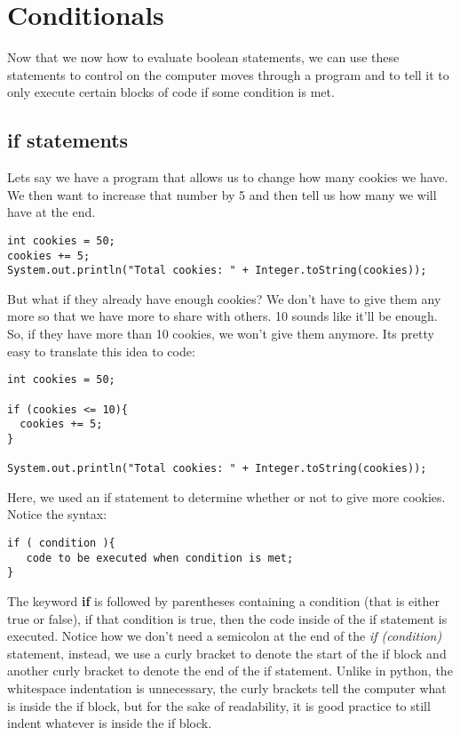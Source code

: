 \documentclass[14pt]{extreport}%
\begin{document}
\section*{Conditionals }
Now that we now how to evaluate boolean statements, we can use these statements to control on the computer moves through a program and to tell it to only execute certain blocks of code if some condition is met.

\subsection*{if statements}
Lets say we have a program that allows us to change how many cookies we have. We then want to increase that number by 5 and then tell us how
many we will have at the end.

\begin{lstlisting}
int cookies = 50;
cookies += 5;
System.out.println("Total cookies: " + Integer.toString(cookies));
\end{lstlisting} 
But what if they already have enough cookies? We don't have to give them
any more so that we have more to share with others. 10 sounds like it'll be
enough. So, if they have more than 10 cookies, we won't give them anymore.
Its pretty easy to translate this idea to code:
\begin{lstlisting}
int cookies = 50;

if (cookies <= 10){
  cookies += 5;
}

System.out.println("Total cookies: " + Integer.toString(cookies));
\end{lstlisting}
Here, we used an if statement to determine whether or not to give more cookies. Notice the syntax:
\begin{lstlisting}
if ( condition ){
   code to be executed when condition is met;
}
\end{lstlisting}
The keyword \textbf{if} is followed by parentheses containing a condition (that is either true or false), if that condition is true, then the code inside of the if statement is executed. Notice how we don't need a semicolon at the end of the \textit{if (condition) } statement, instead, we use a curly bracket to denote the start of the if block and another curly bracket to denote the end of the if statement. Unlike in python, the whitespace indentation is unnecessary, the curly brackets tell the computer what is inside the if block, but for the sake of readability, it is good practice to still indent whatever is inside the if block.
\end{document}
